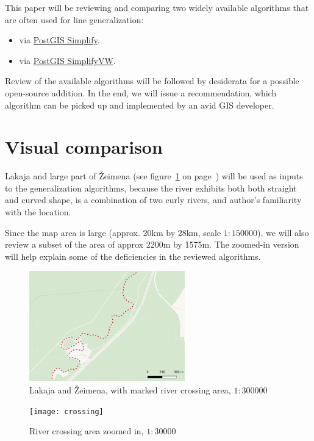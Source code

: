 \documentclass[a4paper]{article}
\begin{document}
This paper will be reviewing and comparing two widely available algorithms that
are often used for line generalization:
\begin{itemize}
    \item \cite{douglas1973algorithms} via
        \href{https://postgis.net/docs/ST_Simplify.html}{PostGIS Simplify}.

    \item \cite{visvalingam1993line} via
        \href{https://postgis.net/docs/ST_SimplifyVW.html}{PostGIS SimplifyVW}.
\end{itemize}

Review of the available algorithms will be followed by desiderata for a
possible open-source addition. In the end, we will issue a recommendation,
which algorithm can be picked up and implemented by an avid GIS developer.

\section{Visual comparison}

Lakaja and large part of Žeimena (see figure~\ref{fig:zeimena} on
page~\pageref{fig:zeimena}) will be used as inputs to the generalization
algorithms, because the river exhibits both both straight and curved shape, is
a combination of two curly rivers, and author's familiarity with the location.

Since the map area is large (approx. 20km by 28km, scale $1:150 000$), we will
also review a subset of the area of approx 2200m by 1575m. The zoomed-in
version will help explain some of the deficiencies in the reviewed algorithms.

\begin{figure}[h]
    \centering
    \includegraphics[width=67.5mm]{zeimena}
    \caption{Lakaja and Žeimena, with marked river crossing area, $1:300000$}
    \label{fig:zeimena}
\end{figure}

\begin{figure}[h]
    \centering
    \texttt{[image: crossing]}
    \caption{River crossing area zoomed in, $1:30000$}
    \label{fig:crossing}
\end{figure}
\end{document}

